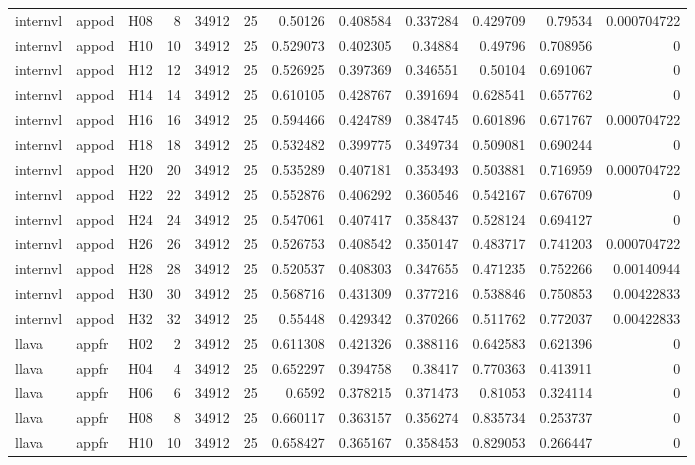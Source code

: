 \begin{longtable}{lllrrrrrrrrr}
internvl & appod & H08 & 8 & 34912 & 25 & 0.50126 & 0.408584 & 0.337284 & 0.429709 & 0.79534 & 0.000704722 \\
internvl & appod & H10 & 10 & 34912 & 25 & 0.529073 & 0.402305 & 0.34884 & 0.49796 & 0.708956 & 0 \\
internvl & appod & H12 & 12 & 34912 & 25 & 0.526925 & 0.397369 & 0.346551 & 0.50104 & 0.691067 & 0 \\
internvl & appod & H14 & 14 & 34912 & 25 & 0.610105 & 0.428767 & 0.391694 & 0.628541 & 0.657762 & 0 \\
internvl & appod & H16 & 16 & 34912 & 25 & 0.594466 & 0.424789 & 0.384745 & 0.601896 & 0.671767 & 0.000704722 \\
internvl & appod & H18 & 18 & 34912 & 25 & 0.532482 & 0.399775 & 0.349734 & 0.509081 & 0.690244 & 0 \\
internvl & appod & H20 & 20 & 34912 & 25 & 0.535289 & 0.407181 & 0.353493 & 0.503881 & 0.716959 & 0.000704722 \\
internvl & appod & H22 & 22 & 34912 & 25 & 0.552876 & 0.406292 & 0.360546 & 0.542167 & 0.676709 & 0 \\
internvl & appod & H24 & 24 & 34912 & 25 & 0.547061 & 0.407417 & 0.358437 & 0.528124 & 0.694127 & 0 \\
internvl & appod & H26 & 26 & 34912 & 25 & 0.526753 & 0.408542 & 0.350147 & 0.483717 & 0.741203 & 0.000704722 \\
internvl & appod & H28 & 28 & 34912 & 25 & 0.520537 & 0.408303 & 0.347655 & 0.471235 & 0.752266 & 0.00140944 \\
internvl & appod & H30 & 30 & 34912 & 25 & 0.568716 & 0.431309 & 0.377216 & 0.538846 & 0.750853 & 0.00422833 \\
internvl & appod & H32 & 32 & 34912 & 25 & 0.55448 & 0.429342 & 0.370266 & 0.511762 & 0.772037 & 0.00422833 \\
llava & appfr & H02 & 2 & 34912 & 25 & 0.611308 & 0.421326 & 0.388116 & 0.642583 & 0.621396 & 0 \\
llava & appfr & H04 & 4 & 34912 & 25 & 0.652297 & 0.394758 & 0.38417 & 0.770363 & 0.413911 & 0 \\
llava & appfr & H06 & 6 & 34912 & 25 & 0.6592 & 0.378215 & 0.371473 & 0.81053 & 0.324114 & 0 \\
llava & appfr & H08 & 8 & 34912 & 25 & 0.660117 & 0.363157 & 0.356274 & 0.835734 & 0.253737 & 0 \\
llava & appfr & H10 & 10 & 34912 & 25 & 0.658427 & 0.365167 & 0.358453 & 0.829053 & 0.266447 & 0 \\

\end{longtable}
